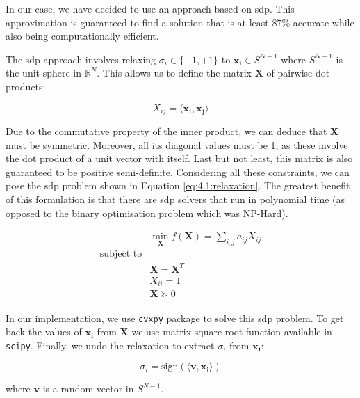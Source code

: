 \documentclass[../main.tex]{subfiles}
\begin{document}
In our case, we have decided to use an approach based on \gls{sdp}. This approximation is guaranteed to find a solution that is at least $87 \si{\percent}$ accurate while also being computationally efficient\cite{kemal2008}.

The \gls{sdp} approach involves relaxing $\sigma_i \in \{-1, +1\}$ to $\bm{x_i} \in S^{N-1}$ where $S^{N-1}$ is the unit sphere in $\mathbb{R}^N$. This allows us to define the matrix $\bm{X}$ of pairwise dot products:

\begin{equation}
    X_{ij} = \langle \bm{x_i}, \bm{x_j} \rangle
\end{equation}

Due to the commutative property of the inner product, we can deduce that $\bm{X}$ must be symmetric. Moreover, all its diagonal values must be 1, as these involve the dot product of a unit vector with itself. Last but not least, this matrix is also guaranteed to be positive semi-definite\cite{kemal2008}. Considering all these constraints, we can pose the \gls{sdp} problem shown in Equation \eqref{eq:4.1:relaxation}. The greatest benefit of this formulation is that there are \gls{sdp} solvers that run in polynomial time (as opposed to the binary optimisation problem which was NP-Hard).

\begin{equation}\label{eq:4.1:relaxation}
\begin{aligned}
    & \min_{\bm{X}} f(\bm{X}) = \sum_{i,j} a_{ij}X_{ij}\\
    \text{subject to}\\
    & \bm{X} = \bm{X}^T\\
    & X_{ii} = 1\\
    & \bm{X} \succeq 0
\end{aligned}
\end{equation}

In our implementation, we use \texttt{cvxpy}\cite{agrawal2018}\cite{diamond2016} package to solve this \gls{sdp} problem. To get back the values of $\bm{x_i}$ from $\bm{X}$ we use matrix square root function available in \texttt{scipy}\cite{virtanen2020}. Finally, we undo the relaxation to extract $\sigma_i$ from $\bm{x_i}$\cite{kemal2008}:

\begin{equation}
    \sigma_i = \text{sign}(\langle \bm{v}, \bm{x_i} \rangle)
\end{equation}

where $\bm{v}$ is a random vector in $S^{N-1}$.
\end{document}
